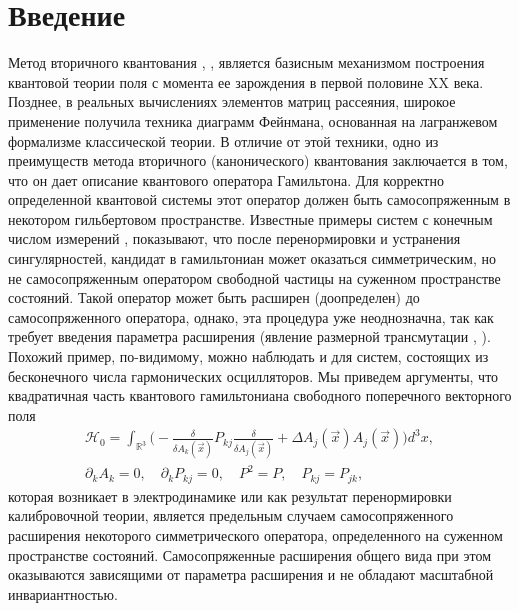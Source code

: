 \documentclass[12pt]{article}
\newcommand{\HH}{\mathscr{H}}
\newcommand{\RR}{\mathbb{R}}
\begin{document}
\section*{Введение}
    Метод вторичного квантования 
\cite{Dirac}, \cite{Fock}, \cite{Becchi}
    является базисным механизмом построения квантовой теории поля
    с момента ее зарождения в первой половине XX века.
    Позднее, в реальных вычислениях элементов матриц рассеяния, широкое
    применение получила техника диаграмм Фейнмана, основанная на
    лагранжевом формализме классической теории.
    В отличие от этой техники, одно из преимуществ метода вторичного
    (канонического) квантования заключается в том,
    что он дает описание квантового оператора Гамильтона.
    Для корректно определенной квантовой системы этот оператор должен быть
    самосопряженным в некотором гильбертовом пространстве.
    Известные примеры систем с конечным числом измерений
\cite{BF},
\cite{Jackiw}
    показывают, что после перенормировки и устранения сингулярностей,
    кандидат в гамильтониан может оказаться симметрическим,
    но не самосопряженным оператором свободной частицы на суженном
    пространстве состояний.
    Такой оператор может быть расширен (доопределен)
    до самосопряженного оператора, однако, эта процедура уже неоднозначна,
    так как требует введения параметра расширения (явление размерной
    трансмутации
\cite{Jackiw},
\cite{LFres}).
    Похожий пример, по-видимому, можно наблюдать и для систем,
    состоящих из бесконечного числа гармонических осцилляторов.
    Мы приведем аргументы, что квадратичная часть квантового гамильтониана
    свободного поперечного векторного поля
\begin{gather*}
    \HH_{0} = \int_{\RR^{3}} \bigl(-\frac{\delta}{\delta A_{k}(\vec{x})}
	P_{kj} \frac{\delta}{\delta A_{j}(\vec{x})}
	+ \Delta A_{j}(\vec{x}) A_{j}(\vec{x}) \bigr)d^{3}x, \\
    \partial_{k} A_{k} = 0,\quad
    \partial_{k} P_{kj} =0, \quad P^{2}=P, \quad P_{kj} = P_{jk},
\end{gather*}
    которая возникает в
    электродинамике или как результат перенормировки калибровочной
    теории, является предельным случаем самосопряженного расширения
    некоторого симметрического оператора, определенного на
    суженном пространстве состояний.
    Самосопряженные
    расширения общего вида при этом оказываются зависящими от параметра
    расширения и не обладают масштабной инвариантностью.
\end{document}
